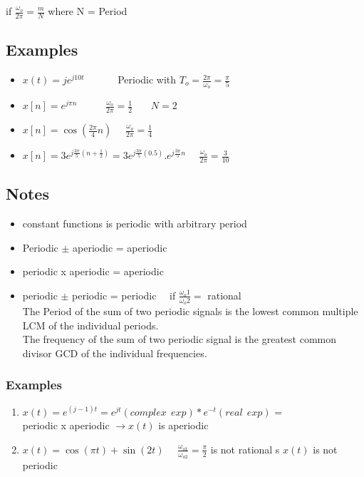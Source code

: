 \documentclass[11pt,a4paper]{article}
\theoremstyle{definition}
\begin{document}
    if $\frac{\omega_o}{2\pi} = \frac{m}{N}$ where N = Period 
    
\subsection{Examples}

\begin{itemize}
    \item  $x(t) = j e^{j10t}$ \ \ \ \ \ \ 
    Periodic with $T_o = \frac{2\pi}{\omega_o} = \frac{\pi}{5}$
   
   \item $ x[n] = e^{j\pi n}$  \ \ \ \ \ $\frac{\omega_o}{2\pi} = \frac{1}{2}$ \ \  \ $N = 2$ 
   
   \item $x[n] = \cos(\frac{2\pi}{4}n)$  \ \ $\frac{\omega_o}{2\pi} = 
        \frac{1}{4}$
    \item $x[n] = 3 e ^{j\frac{3\pi}{5}(n + \frac{1}{2})} = 3 e^{j\frac{3\pi}{5}(0.5)}. e^{j \frac{3\pi}{5}n}$ \  \ 
    $\frac{\omega_o}{2\pi} = \frac{3}{10}$
\end{itemize}
\subsection{Notes}
\begin{itemize}
    \item constant functions is periodic with arbitrary period
    \item Periodic $\pm$ aperiodic  = aperiodic 
    \item periodic x  aperiodic = aperiodic 
    \item periodic $\pm$  periodic = periodic  \ \ if $\frac{\omega _o1}{\omega_o 2} =$ rational \\
    
    The Period of the sum of two periodic signals is the lowest common
    multiple LCM of the individual periods. \\
    
    The frequency of the sum of two periodic signal is the greatest common divisor GCD of the individual frequencies. 

\end{itemize}
\subsubsection{Examples}

\begin{enumerate}
    \item $x(t) = e^{(j-1)t} = e^{jt}(complex \ \ exp) * e^{-t}(real  \  \ exp) $ = \\  periodic x aperiodic  $\longrightarrow x(t)$ is aperiodic 
    
    \item $x(t) = \cos(\pi t) + \sin(2t)$  \ \ $\frac{\omega_{o1}}{\omega_{o2}} = \frac{\pi}{2} $ is not rational s $x(t)$ is not periodic 
\end{enumerate}
\end{document}
